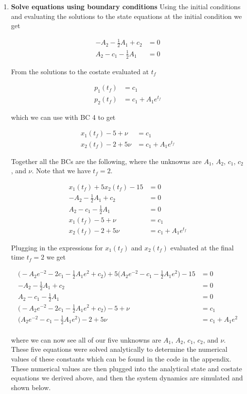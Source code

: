 \documentclass[11pt,letterpaper,onecolumn,notitlepage]{article}
\begin{document}
\begin{enumerate}
  \item{\textbf{Solve equations using boundary conditions}}
  Using the initial conditions and evaluating the solutions to the state equations at the initial condition we get

  \begin{align*}
    -A_{2}-\frac{1}{2}A_{1}+c_{2}&=0 \\
    A_{2}-c_{1}-\frac{1}{2}A_{1}&=0
  \end{align*}

  From the solutions to the costate evaluated at $t_{f}$

  \begin{align*}
    p_{1}(t_{f})&=c_{1} \\
    p_{2}(t_{f})&=c_{1}+A_{1}e^{t_{f}}
  \end{align*}

  which we can use with BC 4 to get

  \begin{align*}
    x_{1}(t_{f})-5+\nu&=c_{1} \\
    x_{2}(t_{f})-2+5\nu&=c_{1}+A_{1}e^{t_{f}}
  \end{align*}

  Together all the BCs are the following, where the unknowns are $A_{1}$, $A_{2}$, $c_{1}$, $c_{2}$, and $\nu$.
  Note that we have $t_{f}=2$.

  \begin{align*}
    x_{1}(t_{f})+5x_{2}(t_{f})-15&=0 \\
    -A_{2}-\frac{1}{2}A_{1}+c_{2}&=0 \\
    A_{2}-c_{1}-\frac{1}{2}A_{1}&=0 \\
    x_{1}(t_{f})-5+\nu&=c_{1} \\
    x_{2}(t_{f})-2+5\nu&=c_{1}+A_{1}e^{t_{f}}
  \end{align*}

  Plugging in the expressions for $x_{1}(t_{f})$ and $x_{2}(t_{f})$ evaluated at the final time $t_{f}=2$ we get

  \begin{align*}
    \bigr(-A_{2}e^{-2}-2c_{1}-\frac{1}{2}A_{1}e^{2}+c_{2}\bigr)+5\bigr(A_{2}e^{-2}-c_{1}-\frac{1}{2}A_{1}e^{2}\bigr)-15&=0 \\
    -A_{2}-\frac{1}{2}A_{1}+c_{2}&=0 \\
    A_{2}-c_{1}-\frac{1}{2}A_{1}&=0 \\
    \bigr(-A_{2}e^{-2}-2c_{1}-\frac{1}{2}A_{1}e^{2}+c_{2}\bigr)-5+\nu&=c_{1} \\
    \bigr(A_{2}e^{-2}-c_{1}-\frac{1}{2}A_{1}e^{2}\bigr)-2+5\nu&=c_{1}+A_{1}e^{2} \\
  \end{align*}

  where we can now see all of our five unknowns are $A_{1}$, $A_{2}$, $c_{1}$, $c_{2}$, and $\nu$.
  These five equations were solved analytically to determine the numerical values of these constants which can be found in the code in the appendix.
  These numerical values are then plugged into the analytical state and costate equations we derived above, and then the system dynamics are simulated and shown below.
\end{enumerate}
\end{document}
